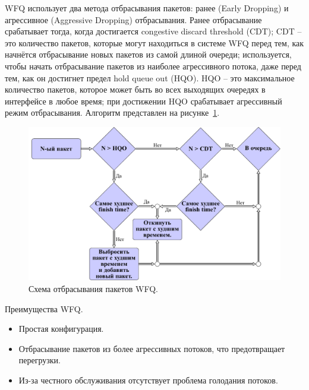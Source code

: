 	

    WFQ использует два метода отбрасывания пакетов: ранее (Early Dropping) и агрессивное
    (Aggressive Dropping) отбрасывания. Ранее отбрасывание срабатывает тогда, когда
    достигается congestive discard threshold (CDT); CDT -- это количество пакетов, которые могут
    находиться в системе WFQ перед тем, как начнётся отбрасывание новых пакетов
    из самой длиной очереди; используется, чтобы начать отбрасывание пакетов
    из наиболее агрессивного потока, даже перед тем, как он достигнет предел
    hold queue out (HQO). HQO -- это максимальное количество пакетов, которое может быть
    во всех выходящих очередях в интерфейсе в любое время; при достижении HQO
    срабатывает агрессивный режим отбрасывания. Алгоритм представлен на рисунке~\ref{pic:wfqdropalgo}.
    \cite{wfqdrop}

    \begin{figure}[ht!]
			\center
        \includegraphics{./pdfimages/fwfq_drop.pdf}
        \caption{Схема отбрасывания пакетов WFQ.}
		\label{pic:wfqdropalgo}
    \end{figure}

    Преимущества WFQ.
    \begin{itemize}
        \item Простая конфигурация.
        \item Отбрасывание пакетов из более агрессивных потоков, что предотвращает перегрузки.
		\item Из-за честного обслуживания отсутствует проблема голодания потоков.
    \end{itemize}

